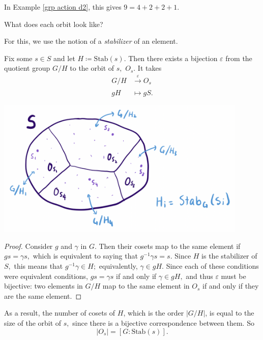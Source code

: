 In Example \ref{grp action d2}, this gives $9 = 4 + 2 + 2 + 1.$

\begin{qq}
What does each orbit look like?
\end{qq}

For this, we use the notion of a \emph{stabilizer} of an element.

\begin{proposition}
Fix some $s \in S$ and let $H \coloneqq \text{Stab}(s).$ Then there exists a bijection $\varepsilon$ from the quotient group $G/H$ to the orbit of $s,$ $O_s.$ It takes 
\begin{align*}
    G/H &\xrightarrow[]{\varepsilon} O_s \\
    gH &\mapsto gS.
\end{align*}
\end{proposition}

\begin{center}
    \includegraphics[width=12cm]{Lecture Files and Images/lec17-drawing.png}
\end{center}


\begin{proof}
Consider $g$ and $\gamma$ in $G.$ Then their cosets map to the same element if $gs = \gamma s,$ which is equivalent to saying that $g^{-1}\gamma s = s$. Since $H$ is the stabilizer of $S,$ this means that $g^{-1}\gamma \in H;$ equivalently, $\gamma \in gH.$ Since each of these conditions were equivalent conditions, $gs = \gamma s$ if and only if $\gamma \in gH,$ and thus $\varepsilon$ must be bijective: two elements in $G/H$ map to the same element in $O_s$ if and only if they are the same element.
\end{proof}

\begin{corollary}
As a result, the number of cosets of $H$, which is the order $|G/H|$, is equal to the size of the orbit of $s,$ since there is a bijective correspondence between them. So 
\[
|O_s| = [G : \text{Stab}(s)].
\]
\end{corollary}

